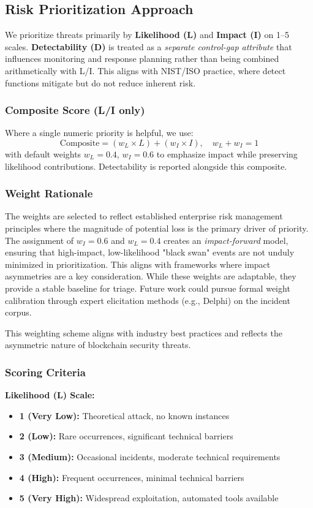 \subsection{Risk Prioritization Approach}
\label{sec:risk_quantification}

We prioritize threats primarily by \textbf{Likelihood (L)} and \textbf{Impact (I)} on 1--5 scales. \textbf{Detectability (D)} is treated as a \textit{separate control-gap attribute} that influences monitoring and response planning rather than being combined arithmetically with L/I. This aligns with NIST/ISO practice, where detect functions mitigate but do not reduce inherent risk.

\subsubsection{Composite Score (L/I only)}
Where a single numeric priority is helpful, we use:
\begin{equation}
    \text{Composite} = (w_L \times L) + (w_I \times I),\quad w_L + w_I = 1
\end{equation}
with default weights $w_L=0.4$, $w_I=0.6$ to emphasize impact while preserving likelihood contributions. Detectability is reported alongside this composite.

\subsubsection{Weight Rationale}
The weights are selected to reflect established enterprise risk management principles where the magnitude of potential loss is the primary driver of priority. The assignment of $w_I=0.6$ and $w_L=0.4$ creates an \textit{impact-forward} model, ensuring that high-impact, low-likelihood "black swan" events are not unduly minimized in prioritization. This aligns with frameworks where impact asymmetries are a key consideration. While these weights are adaptable, they provide a stable baseline for triage. Future work could pursue formal weight calibration through expert elicitation methods (e.g., Delphi) on the incident corpus.

This weighting scheme aligns with industry best practices and reflects the asymmetric nature of blockchain security threats.

\subsubsection{Scoring Criteria}
\textbf{Likelihood (L) Scale:}
\begin{itemize}
    \item \textbf{1 (Very Low):} Theoretical attack, no known instances
    \item \textbf{2 (Low):} Rare occurrences, significant technical barriers
    \item \textbf{3 (Medium):} Occasional incidents, moderate technical requirements
    \item \textbf{4 (High):} Frequent occurrences, minimal technical barriers
    \item \textbf{5 (Very High):} Widespread exploitation, automated tools available
\end{itemize}

